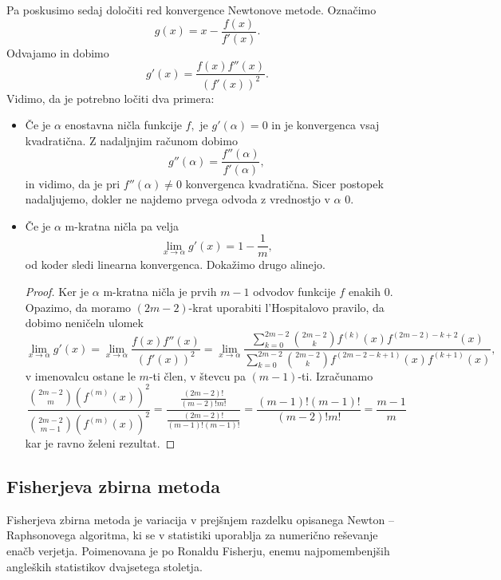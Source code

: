 \documentclass[12pt,a4paper]{amsart}
\theoremstyle{definition} %
\theoremstyle{plain} %
\begin{document}
Pa poskusimo sedaj določiti red konvergence Newtonove metode. Označimo
\[
    g(x) = x - \frac{f(x)}{f'(x)}.
\]
Odvajamo in dobimo
\[
    g'(x) = \frac{f(x)f''(x)}{(f'(x))^{2}}.
\]
Vidimo, da je potrebno ločiti dva primera:
\begin{itemize}
    \item Če je $\alpha$ enostavna ničla funkcije $f,$ je $g'(\alpha)=0$ in je konvergenca vsaj kvadratična. Z nadaljnjim računom dobimo
    \[
        g''(\alpha) = \frac{f''(\alpha)}{f'(\alpha)},
    \]
    in vidimo, da je pri $f''(\alpha) \neq 0$ konvergenca kvadratična. Sicer postopek nadaljujemo, dokler ne najdemo prvega odvoda z vrednostjo v $\alpha$ 0.
    \item Če je $\alpha$ m-kratna ničla pa velja
    \[
        \lim_{x\to\alpha} g'(x) = 1 - \frac{1}{m},
    \]
    od koder sledi linearna konvergenca. Dokažimo drugo alinejo.
    \begin{proof}
        Ker je $\alpha$ m-kratna ničla je prvih $m-1$ odvodov funkcije $f$ enakih 0. Opazimo, da moramo $(2m-2)$-krat uporabiti l'Hospitalovo pravilo, da dobimo neničeln ulomek
        \begin{equation*}
            \lim_{x\to\alpha} g'(x) = \lim_{x\to\alpha} \frac{f(x)f''(x)}{(f'(x))^{2}}
            = \lim_{x\to\alpha} \frac{\sum_{k=0}^{2m-2}\binom{2m-2}{k}f^{(k)}(x)f^{(2m-2)-k+2}(x)}{\sum_{k=0}^{2m-2}\binom{2m-2}{k}f^{(2m-2-k+1)}(x)f^{(k+1)}(x)},
        \end{equation*}
        v imenovalcu ostane le $m$-ti člen, v števcu pa $(m-1)$-ti. Izračunamo
        \[
            \frac{\binom{2m-2}{m}(f^{(m)}(x))^{2}}{\binom{2m-2}{m-1}(f^{(m)}(x))^{2}} = \frac{\frac{(2m-2)!}{(m-2)!m!}}{\frac{(2m-2)!}{(m-1)!(m-1)!}} = \frac{(m-1)!(m-1)!}{(m-2)!m!} = \frac{m-1}{m}
        \]
        kar je ravno želeni rezultat.
    \end{proof}

\end{itemize}
\subsection{Fisherjeva zbirna metoda}
Fisherjeva zbirna metoda je variacija v prejšnjem razdelku opisanega Newton -- Raphsonovega algoritma, ki se v statistiki uporablja za numerično reševanje enačb 
verjetja. Poimenovana je po Ronaldu Fisherju, enemu najpomembenjših angleških statistikov dvajsetega stoletja.
\end{document}
